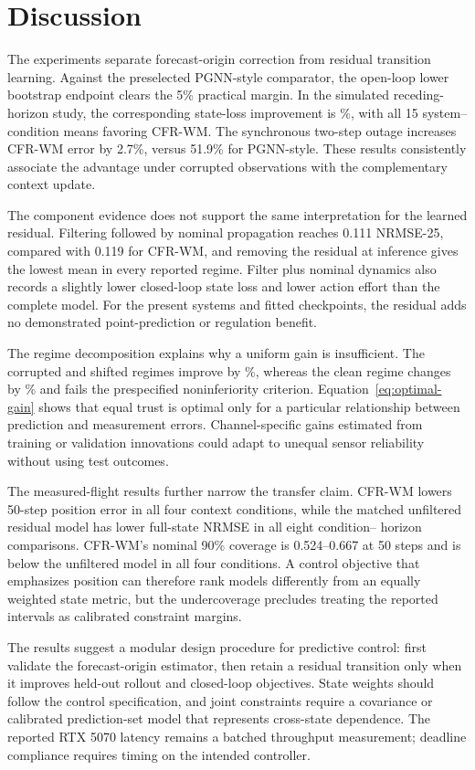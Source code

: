 \section{Discussion}

The experiments separate forecast-origin correction from residual transition
learning. Against the preselected PGNN-style comparator, the open-loop lower
bootstrap endpoint clears the 5\% practical margin. In the simulated
receding-horizon study, the corresponding state-loss improvement is
\ClosedLoopImprovement\%, with all 15 system--condition means favoring
CFR-WM. The synchronous two-step outage increases CFR-WM error by 2.7\%,
versus 51.9\% for PGNN-style. These results consistently associate the
advantage under corrupted observations with the complementary context update.

The component evidence does not support the same interpretation for the
learned residual. Filtering followed by nominal propagation reaches 0.111
NRMSE-25, compared with 0.119 for CFR-WM, and removing the residual at
inference gives the lowest mean in every reported regime. Filter plus nominal
dynamics also records a slightly lower closed-loop state loss and lower action
effort than the complete model. For the present systems and fitted
checkpoints, the residual adds no demonstrated point-prediction or regulation
benefit.

The regime decomposition explains why a uniform gain is insufficient. The
corrupted and shifted regimes improve by \CorruptImprovement\%, whereas the
clean regime changes by \CleanImprovement\% and fails the prespecified
noninferiority criterion. Equation~\eqref{eq:optimal-gain} shows that equal
trust is optimal only for a particular relationship between prediction and
measurement errors. Channel-specific gains estimated from training or
validation innovations could adapt to unequal sensor reliability without
using test outcomes.

The measured-flight results further narrow the transfer claim. CFR-WM lowers
50-step position error in all four context conditions, while the matched
unfiltered residual model has lower full-state NRMSE in all eight condition--
horizon comparisons. CFR-WM's nominal 90\% coverage is 0.524--0.667 at 50
steps and is below the unfiltered model in all four conditions. A control
objective that emphasizes position can therefore rank models differently from
an equally weighted state metric, but the undercoverage precludes treating the
reported intervals as calibrated constraint margins.

The results suggest a modular design procedure for predictive control: first
validate the forecast-origin estimator, then retain a residual transition only
when it improves held-out rollout and closed-loop objectives. State weights
should follow the control specification, and joint constraints require a
covariance or calibrated prediction-set model that represents cross-state
dependence. The reported RTX 5070 latency remains a batched throughput
measurement; deadline compliance requires timing on the intended controller.
